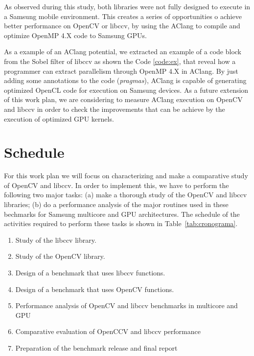 \documentclass[12pt, fleqn]{article}
\begin{document}
As observed during this study, both libraries were not fully designed to execute in  a Samsung mobile environment. This creates  a series of opportunities o achieve better performance on OpenCV or libccv, by using the AClang to compile and optimize OpenMP 4.X code to Samsung GPUs. 

As a example of an AClang potential, we  extracted an example of a code block  from the Sobel filter of libccv as shown the Code \ref{code:ex}, that reveal how a programmer can extract parallelism through OpenMP 4.X in AClang. By just  adding some annotations to the code (\textit{pragmas}), AClang is capable of generating optimized OpenCL code for execution on Samsung devices. As a future extension  of this work plan, we  are considering to measure AClang execution on OpenCV and libccv in order to check the improvements that can be achieve by the execution of  optimized GPU kernels.

\section{Schedule}
\label{sec:schedule}

For this work plan we will focus on characterizing and make a comparative study of OpenCV and libccv. In order to implement this, we have to perform the following two major tasks: (a) make a thorough study of the OpenCV and libccv libraries; (b) do a performance analysis of the major routines used in these bechmarks for Samsung multicore and GPU architectures. The schedule of the activities required to perform these tasks is shown in Table~\ref{tab:cronograma}.

\begin{enumerate}
\item Study of the libccv library.
\item Study of the OpenCV library.
\item Design of a  benchmark that uses libccv functions. 
\item Design of a benchmark that uses OpenCV functions.
\item Performance analysis of OpenCV and libccv benchmarks in multicore and GPU
\item Comparative evaluation of OpenCCV and libccv performance 
\item Preparation of the benchmark release and final report
\end{enumerate}
\end{document}
